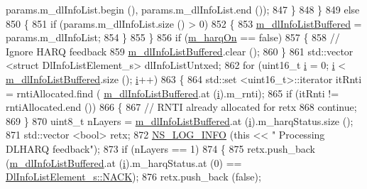 \begin{DoxyCode}
       params.m\_dlInfoList.begin (), params.m\_dlInfoList.end ());
847         \}
848     \}
849   \textcolor{keywordflow}{else}
850     \{
851       \textcolor{keywordflow}{if} (params.m\_dlInfoList.size () > 0)
852         \{
853           \hyperlink{classns3_1_1PssFfMacScheduler_a3a7d9c7460c66767201d15a1d6f58758}{m\_dlInfoListBuffered} = params.m\_dlInfoList;
854         \}
855     \}
856   \textcolor{keywordflow}{if} (\hyperlink{classns3_1_1PssFfMacScheduler_a7163e6149892abe4c17ce95be6bf1953}{m\_harqOn} == \textcolor{keyword}{false})
857     \{
858       \textcolor{comment}{// Ignore HARQ feedback}
859       \hyperlink{classns3_1_1PssFfMacScheduler_a3a7d9c7460c66767201d15a1d6f58758}{m\_dlInfoListBuffered}.clear ();
860     \}
861   std::vector <struct DlInfoListElement\_s> dlInfoListUntxed;
862   \textcolor{keywordflow}{for} (uint16\_t \hyperlink{bernuolliDistribution_8m_a6f6ccfcf58b31cb6412107d9d5281426}{i} = 0; \hyperlink{bernuolliDistribution_8m_a6f6ccfcf58b31cb6412107d9d5281426}{i} < \hyperlink{classns3_1_1PssFfMacScheduler_a3a7d9c7460c66767201d15a1d6f58758}{m\_dlInfoListBuffered}.size (); \hyperlink{bernuolliDistribution_8m_a6f6ccfcf58b31cb6412107d9d5281426}{i}++)
863     \{
864       std::set <uint16\_t>::iterator itRnti = rntiAllocated.find (
      \hyperlink{classns3_1_1PssFfMacScheduler_a3a7d9c7460c66767201d15a1d6f58758}{m\_dlInfoListBuffered}.at (\hyperlink{bernuolliDistribution_8m_a6f6ccfcf58b31cb6412107d9d5281426}{i}).m\_rnti);
865       \textcolor{keywordflow}{if} (itRnti != rntiAllocated.end ())
866         \{
867           \textcolor{comment}{// RNTI already allocated for retx}
868           \textcolor{keywordflow}{continue};
869         \}
870       uint8\_t nLayers = \hyperlink{classns3_1_1PssFfMacScheduler_a3a7d9c7460c66767201d15a1d6f58758}{m\_dlInfoListBuffered}.at (\hyperlink{bernuolliDistribution_8m_a6f6ccfcf58b31cb6412107d9d5281426}{i}).m\_harqStatus.size ();
871       std::vector <bool> retx;
872       \hyperlink{group__logging_gafbd73ee2cf9f26b319f49086d8e860fb}{NS\_LOG\_INFO} (\textcolor{keyword}{this} << \textcolor{stringliteral}{" Processing DLHARQ feedback"});
873       \textcolor{keywordflow}{if} (nLayers == 1)
874         \{
875           retx.push\_back (\hyperlink{classns3_1_1PssFfMacScheduler_a3a7d9c7460c66767201d15a1d6f58758}{m\_dlInfoListBuffered}.at (\hyperlink{bernuolliDistribution_8m_a6f6ccfcf58b31cb6412107d9d5281426}{i}).m\_harqStatus.at (0) == 
      \hyperlink{structns3_1_1DlInfoListElement__s_a3e55b89f756b7bd8909c8116a202a17aaf90e76e67c86729b4ee21927b7fb1770}{DlInfoListElement\_s::NACK});
876           retx.push\_back (\textcolor{keyword}{false});

\end{DoxyCode}
